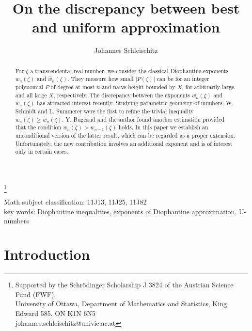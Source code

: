 \documentclass[12pt]{amsart}
\theoremstyle{definition}
\begin{document}
	



\title[Best versus uniform approximation]{On the discrepancy between best and uniform approximation}

\author{Johannes Schleischitz}
                            
\thanks{Supported by the Schr\"odinger Scholarship J 3824 of the Austrian Science Fund (FWF).\\
University of Ottawa, Department of Mathematics and Statistics, King Edward 585, ON K1N 6N5 \\
	johannes.schleischitz@univie.ac.at}

                       


\begin{abstract}
For $\zeta$ a transcendental real number, we consider the classical Diophantine exponents $w_{n}(\zeta)$
and $\widehat{w}_{n}(\zeta)$. They
measure how small $\vert P(\zeta)\vert$ can be for an integer polynomial $P$
of degree at most $n$ and naive height bounded by $X$, for arbitrarily large and all large $X$, respectively.
The discrepancy between the
exponents $w_{n}(\zeta)$ and $\widehat{w}_{n}(\zeta)$ has attracted interest recently. Studying parametric geometry
of numbers, W. Schmidt and L. Summerer were the first to refine the trivial inequality $w_{n}(\zeta)\geq \widehat{w}_{n}(\zeta)$.
Y. Bugeaud and the author found another estimation 
provided that the condition $w_{n}(\zeta)>w_{n-1}(\zeta)$ holds.
In this paper we establish an unconditional version of the latter result, which can be regarded as a proper extension. 
Unfortunately, the new contribution involves an additional exponent and is of interest only in certain cases.   
\end{abstract}

\maketitle

{\footnotesize{Math subject classification: 11J13, 11J25, 11J82 \\
key words: Diophantine inequalities, exponents of Diophantine approximation, U-numbers}}





\section{Introduction} \label{sek1}
\end{document}
